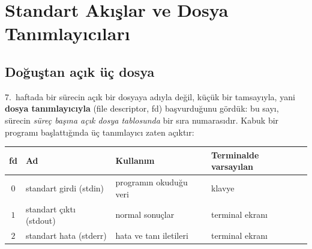 \documentclass[11pt,a4paper]{article}
\newcommand{\term}[1]{\textbf{\color{mintdeep}#1}}
\begin{document}
\section{Standart Akışlar ve Dosya Tanımlayıcıları}
\label{sec:streams}

\subsection{Doğuştan açık üç dosya}

7.~haftada bir sürecin açık bir dosyaya adıyla değil, küçük bir tamsayıyla, yani \term{dosya tanımlayıcıyla} (file descriptor, fd) başvurduğunu gördük: bu sayı, sürecin \emph{süreç başına açık dosya tablosunda} bir sıra numarasıdır. Kabuk bir programı başlattığında üç tanımlayıcı zaten açıktır:

\begin{center}
\renewcommand{\arraystretch}{1.25}
\begin{tabular}{@{}clll@{}}
\toprule
\textbf{fd} & \textbf{Ad} & \textbf{Kullanım} & \textbf{Terminalde varsayılan}\\
\midrule
$0$ & standart girdi (stdin) & programın okuduğu veri & klavye\\
$1$ & standart çıktı (stdout) & normal sonuçlar & terminal ekranı\\
$2$ & standart hata (stderr) & hata ve tanı iletileri & terminal ekranı\\
\bottomrule
\end{tabular}
\end{center}
\end{document}
